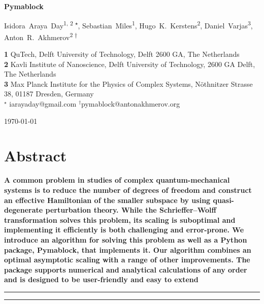 \documentclass[submission, Codebases]{SciPost}
\begin{document}
\begin{center}
{\Large \textbf{Pymablock}}
\end{center}

\begin{center}
Isidora~Araya~Day\textsuperscript{1, 2 $\star$},
Sebastian~Miles\textsuperscript{1},
Hugo~K.~Kerstens\textsuperscript{2},
Daniel~Varjas\textsuperscript{3},
Anton~R.~Akhmerov\textsuperscript{2 $\dagger$}
\end{center}

\begin{center}
{\bf 1} QuTech, Delft University of Technology, Delft 2600 GA, The Netherlands \\
{\bf 2} Kavli Institute of Nanoscience, Delft University of Technology, 2600 GA Delft, The Netherlands \\
{\bf 3} Max Planck Institute for the Physics of Complex Systems, Nöthnitzer Strasse 38, 01187 Dresden, Germany \\
${}^\star$ {\small \sf iarayaday@gmail.com}
${}^\dagger${\small \sf pymablock@antonakhmerov.org}
\end{center}

\begin{center}
    \today
\end{center}

\section*{Abstract}
\textbf{
A common problem in studies of complex quantum-mechanical systems is to reduce the number of degrees of freedom and construct an effective Hamiltonian of the smaller subspace by using quasi-degenerate perturbation theory.
While the Schrieffer--Wolff transformation solves this problem, its scaling is suboptimal and implementing it efficiently is both challenging and error-prone.
We introduce an algorithm for solving this problem as well as a Python package, Pymablock, that implements it.
Our algorithm combines an optimal asymptotic scaling with a range of other improvements.
The package supports numerical and analytical calculations of any order and is designed to be user-friendly and easy to extend
}

\vspace{10pt}
\noindent\rule{\textwidth}{1pt}
\tableofcontents\thispagestyle{fancy}
\noindent\rule{\textwidth}{1pt}
\vspace{10pt}

\listoftodos








\printglossaries




\nolinenumbers
\end{document}
